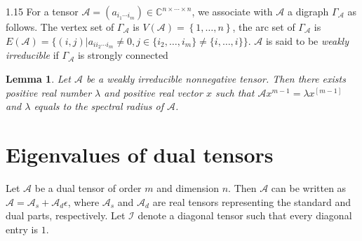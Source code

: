 \documentclass[preprint,12pt]{elsarticle}
\newtheorem{lem}[thm]{Lemma}
\begin{document}
\begin{spacing}{1.15}
For a tensor $\mathcal{A}=(a_{i_1\cdots i_m })\in\mathbb{C}^{n\times\cdots\times n}$, we associate with $\mathcal{A}$ a digraph $\Gamma_{\mathcal{A}}$ as follows. The vertex set of $\Gamma_{\mathcal{A}}$ is $V(\mathcal{A})=\left\{1,\ldots,n\right\}$, the arc set of $\Gamma_{\mathcal{A}}$ is $E(\mathcal{A }) = \{(i,j)|a_{ii_2\cdots i_m}\neq0,j\in\{i_2,\ldots,i_m\}\neq\{i,\ldots,i\}\}$. $\mathcal{A}$ is said to be \textit{weakly irreducible} if $\Gamma_{\mathcal{A}}$ is strongly connected
\begin{lem}\label{lem2.4} \cite{friedland2013perron}
Let $\mathcal{A}$ be a weakly irreducible nonnegative tensor. Then there exists positive real number $\lambda$ and positive real vector $x$ such that $\mathcal{A}x^{m-1}=\lambda x^{[m-1]}$ and $\lambda$ equals to the spectral radius of $\mathcal{A}$.
\end{lem}

\section{Eigenvalues of dual tensors}
Let $\mathcal{A}$ be a dual tensor of order $m$ and dimension $n$. Then $\mathcal{A}$ can be written as $\mathcal{A}=\mathcal{A}_s+\mathcal{A}_d\epsilon$, where $\mathcal{A}_s$ and $\mathcal{A}_d$ are real tensors representing the standard and dual parts, respectively. Let $\mathcal{I}$ denote a diagonal tensor such that every diagonal entry is $1$.


\end{spacing}
\end{document}
